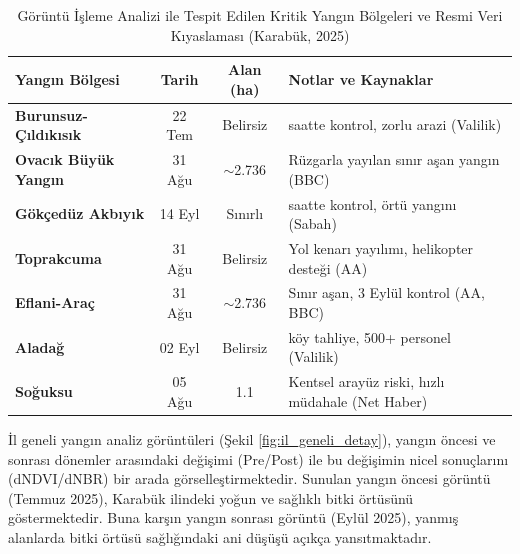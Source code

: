 \documentclass[11pt,a4paper]{article}
\begin{document}
\begin{table}[H]
    \centering
    \caption{Görüntü İşleme Analizi ile Tespit Edilen Kritik Yangın Bölgeleri ve Resmi Veri Kıyaslaması (Karabük, 2025)}
    \label{tab:fire_inventory}
    \begin{tabular}{@{}p{4.5cm}cc>{\raggedright\arraybackslash}p{5cm}@{}}
    \toprule
    \textbf{Yangın Bölgesi} & \textbf{Tarih} & \textbf{Alan (ha)} & \textbf{Notlar ve Kaynaklar} \\ \midrule
    \textbf{Burunsuz-Çıldıkısık} & 22 Tem & Belirsiz & 18 saatte kontrol, zorlu arazi (Valilik) \\
    \textbf{Ovacık Büyük Yangın} & 31 Ağu & $\sim$2.736 & Rüzgarla yayılan sınır aşan yangın (BBC) \\
    \textbf{Gökçedüz Akbıyık} & 14 Eyl & Sınırlı & 3 saatte kontrol, örtü yangını (Sabah) \\
    \textbf{Toprakcuma} & 31 Ağu & Belirsiz & Yol kenarı yayılımı, helikopter desteği (AA) \\
    \textbf{Eflani-Araç} & 31 Ağu & $\sim$2.736 & Sınır aşan, 3 Eylül kontrol (AA, BBC) \\
    \textbf{Aladağ} & 02 Eyl & Belirsiz & 3 köy tahliye, 500+ personel (Valilik) \\
    \textbf{Soğuksu} & 05 Ağu & 1.1 & Kentsel arayüz riski, hızlı müdahale (Net Haber) \\ \bottomrule
    \end{tabular}
\end{table}

İl geneli yangın analiz görüntüleri (Şekil \ref{fig:il_geneli_detay}), yangın öncesi ve sonrası dönemler arasındaki değişimi (Pre/Post) ile bu değişimin nicel sonuçlarını (dNDVI/dNBR) bir arada görselleştirmektedir.
Sunulan yangın öncesi görüntü (Temmuz 2025), Karabük ilindeki yoğun ve sağlıklı bitki örtüsünü göstermektedir. 
Buna karşın yangın sonrası görüntü (Eylül 2025), yanmış alanlarda bitki örtüsü sağlığındaki ani düşüşü açıkça yansıtmaktadır.
\end{document}
